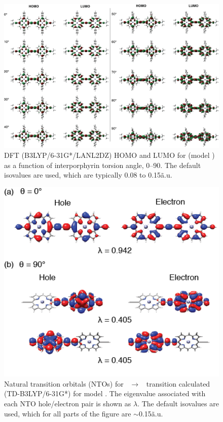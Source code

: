		\begin{figure}[ht!]
			\centering\includegraphics[width=\textwidth]{figures/dimer/homo-lumo.png} 
			\caption[]{DFT (B3LYP/6-31G*/LANL2DZ) HOMO and LUMO for  (model ) as a function of interporphyrin torsion angle, 0–90\textdegree. The default isovalues are used, which are typically 0.08 to 0.15\~a.u.}
			\label{fig:dimer:s5}
		\end{figure}


		\begin{figure}[ht!]
			\centering\includegraphics{figures/dimer/si-s4.png} 
			\caption[]{Natural transition orbitals (NTOs) for ~$\rightarrow$~ transition calculated (TD-B3LYP/6-­31G*) for model . The eigenvalue associated with each NTO hole/electron pair is shown as $\lambda$. The default isovalues are used, which for all parts of the figure are $\sim$0.15\~a.u.}
			\label{fig:dimer:s4}
		\end{figure}

